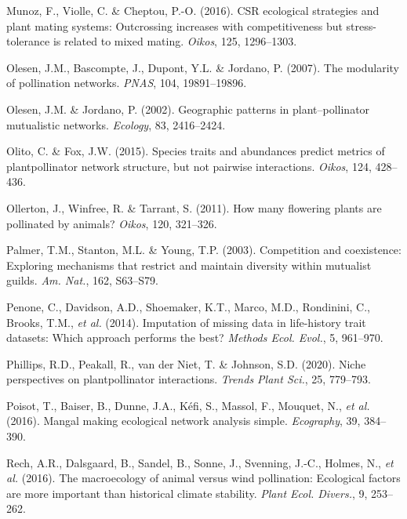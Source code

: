 \documentclass[
  12pt,
  a4paper,
]{article}
\newlength{\cslhangindent}
\newlength{\cslentryspacingunit} %
\newenvironment{CSLReferences}[2] %
 {%
  \setlength{\parindent}{0pt}
  \ifodd #1
  \let\oldpar\par
  \def\par{\hangindent=\cslhangindent\oldpar}
  \fi
  \setlength{\parskip}{#2\cslentryspacingunit}
 }%
 {}
\begin{document}
\begin{CSLReferences}{1}{0}
\leavevmode{}%
Munoz, F., Violle, C. \& Cheptou, P.-O. (2016). {CSR} ecological strategies and plant mating systems: Outcrossing increases with competitiveness but stress-tolerance is related to mixed mating. \emph{Oikos}, 125, 1296--1303.

\leavevmode{}%
Olesen, J.M., Bascompte, J., Dupont, Y.L. \& Jordano, P. (2007). The modularity of pollination networks. \emph{PNAS}, 104, 19891--19896.

\leavevmode{}%
Olesen, J.M. \& Jordano, P. (2002). Geographic patterns in plant--pollinator mutualistic networks. \emph{Ecology}, 83, 2416--2424.

\leavevmode{}%
Olito, C. \& Fox, J.W. (2015). Species traits and abundances predict metrics of plant\textendash pollinator network structure, but not pairwise interactions. \emph{Oikos}, 124, 428--436.

\leavevmode{}%
Ollerton, J., Winfree, R. \& Tarrant, S. (2011). How many flowering plants are pollinated by animals? \emph{Oikos}, 120, 321--326.

\leavevmode{}%
Palmer, T.M., Stanton, M.L. \& Young, T.P. (2003). Competition and coexistence: Exploring mechanisms that restrict and maintain diversity within mutualist guilds. \emph{Am. Nat.}, 162, S63--S79.

\leavevmode{}%
Penone, C., Davidson, A.D., Shoemaker, K.T., Marco, M.D., Rondinini, C., Brooks, T.M., \emph{et al.} (2014). Imputation of missing data in life-history trait datasets: Which approach performs the best? \emph{Methods Ecol. Evol.}, 5, 961--970.

\leavevmode{}%
Phillips, R.D., Peakall, R., van der Niet, T. \& Johnson, S.D. (2020). Niche perspectives on plant\textendash pollinator interactions. \emph{Trends Plant Sci.}, 25, 779--793.

\leavevmode{}%
Poisot, T., Baiser, B., Dunne, J.A., Kéfi, S., Massol, F., Mouquet, N., \emph{et al.} (2016). Mangal \textendash{} making ecological network analysis simple. \emph{Ecography}, 39, 384--390.

\leavevmode{}%
Rech, A.R., Dalsgaard, B., Sandel, B., Sonne, J., Svenning, J.-C., Holmes, N., \emph{et al.} (2016). The macroecology of animal versus wind pollination: Ecological factors are more important than historical climate stability. \emph{Plant Ecol. Divers.}, 9, 253--262.


\end{CSLReferences}
\end{document}
